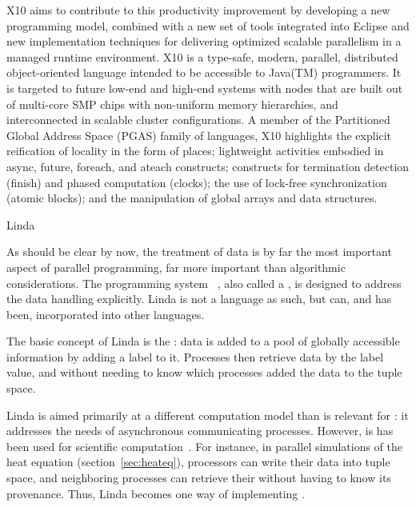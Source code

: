 X10 aims to contribute to this productivity improvement by developing
a new programming model, combined with a new set of tools integrated
into Eclipse and new implementation techniques for delivering
optimized scalable parallelism in a managed runtime environment. X10
is a type-safe, modern, parallel, distributed object-oriented language
intended to be accessible to Java(TM) programmers. It is
targeted to future low-end and high-end systems with nodes that are
built out of multi-core SMP chips with non-uniform memory hierarchies,
and interconnected in scalable cluster configurations. A member of the
Partitioned Global Address Space (PGAS) family of languages, X10
highlights the explicit reification of locality in the form of places;
lightweight activities embodied in async, future, foreach, and ateach
constructs; constructs for termination detection (finish) and phased
computation (clocks); the use of lock-free synchronization (atomic
blocks); and the manipulation of global arrays and data structures.


 {Linda}

As should be clear by now, the treatment of data is by far the most
important aspect of parallel programming, far more important than
algorithmic considerations. The programming system
~\cite{Gelernter85generativecommunication,Linda-CACM}, also called a
, is designed to address the data
handling explicitly. Linda is not a language as such, but can, and has
been, incorporated into other languages.

The basic concept of Linda is the : data is added
to a pool of globally accessible information by adding a label to
it. Processes then retrieve data by the label value, and without needing to
know which processes added the data to the tuple space.

Linda is aimed primarily at a different computation model than is
relevant for : it addresses the needs of
asynchronous communicating processes. However, is has been used for
scientific computation~\cite{Deshpande92efficientparallel}. For
instance, in parallel simulations of the heat equation
(section~\ref{sec:heateq}), processors can write their data into tuple
space, and neighboring processes can retrieve their
 without having to
know its provenance. Thus, Linda becomes one way of implementing
.

